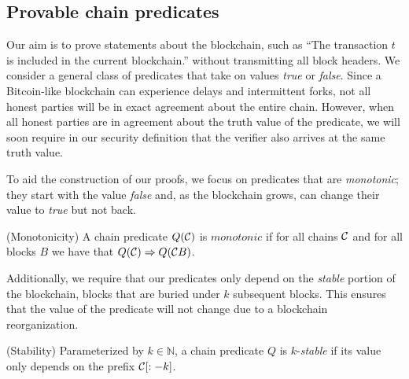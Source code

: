 \subsection{Provable chain predicates}

Our aim is to prove statements about the blockchain, such as ``The transaction
$t$ is included in the current blockchain.'' without transmitting all block
headers. We consider a general class of predicates that take on values
\emph{true} or \emph{false}.  Since a Bitcoin-like blockchain can experience
delays and intermittent forks, not all honest parties will be in exact agreement
about the entire chain. However, when all honest parties are in agreement about
the truth value of the predicate, we will soon require in our security
definition that the verifier also arrives at the same truth value.

To aid the construction of our proofs, we focus on predicates that are
\emph{monotonic}; they start with the value \emph{false} and, as the blockchain
grows, can change their value to \emph{true} but not back.

\begin{definition}{(Monotonicity)}
    A chain predicate $Q(\mathcal{C})$ is $\textit{monotonic}$ if for all chains
    $\mathcal{C}$ and for all blocks $B$ we have that
    $Q(\mathcal{C}) \Rightarrow Q(\mathcal{C} B)$.
\end{definition}

Additionally, we require that our predicates only depend on the \emph{stable}
portion of the blockchain, blocks that are buried under $k$ subsequent blocks.
This ensures that the value of the predicate will not change due to a blockchain
reorganization.

\begin{definition}{(Stability)}
    Parameterized by $k \in \mathbb{N}$, a chain predicate $Q$ is
    $k$-\emph{stable} if its value only depends on the prefix $\mathcal{C}[:-k]$.
\end{definition}
